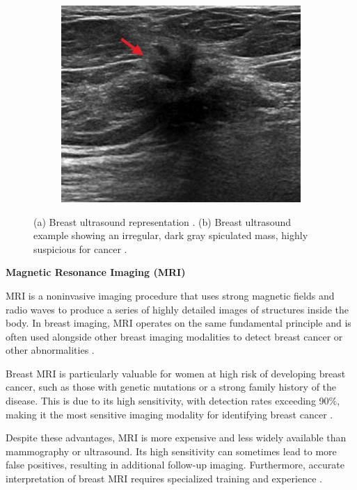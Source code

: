 \documentclass[a4paper,10pt]{book}
\begin{document}
\begin{figure}[h!]
\begin{subfigure}[c]{0.45\textwidth}
		\includegraphics[width=\textwidth]{reports/assets/ultrasound.jpg}
            \caption{}
		\label{fig:ultrasound}
	\end{subfigure}
	\caption[Breast ultrasound procedure and example]{(a) Breast ultrasound representation \cite{macauley_start--finish_2022}. (b) Breast ultrasound example showing an irregular, dark gray spiculated mass, highly suspicious for cancer \cite{noauthor_breast_nodate}.}
\label{fig:breast_ultrasound_comparison}
\end{figure}

\textbf{Magnetic Resonance Imaging (MRI)}

MRI is a noninvasive imaging procedure that uses strong magnetic fields and radio waves to produce a series of highly detailed images of structures inside the body. In breast imaging, MRI operates on the same fundamental principle and is often used alongside other breast imaging modalities to detect breast cancer or other abnormalities \cite{nih_definition_2011}. 

Breast MRI is particularly valuable for women at high risk of developing breast cancer, such as those with genetic mutations or a strong family history of the disease. This is due to its high sensitivity, with detection rates exceeding 90\%, making it the most sensitive imaging modality for identifying breast cancer \cite{radswiki_breast_nodate}.

Despite these advantages, MRI is more expensive and less widely available than mammography or ultrasound. Its high sensitivity can sometimes lead to more false positives, resulting in additional follow-up imaging. Furthermore, accurate interpretation of breast MRI requires specialized training and experience \cite{noauthor_technical_nodate}.
\end{document}
